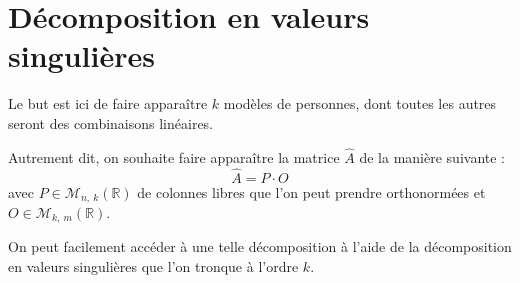 \documentclass[12pt, a4paper]{article}
\newcommand{\Ap}{\widehat{A}} %
\newcommand{\pp}[1]{\left(#1\right)} %
\begin{document}
\section{Décomposition en valeurs singulières}

Le but est ici de faire apparaître $k$ modèles de personnes, dont toutes les autres seront des combinaisons linéaires.

Autrement dit, on souhaite faire apparaître la matrice $\Ap$ de la manière suivante : \[
	\Ap = P\cdot O
\]
avec $P \in \mathcal{M}_{n,\:k}\pp{\mathbb{R}}$ de colonnes libres que l'on peut prendre orthonormées et $O \in \mathcal{M}_{k,\:m}\pp{\mathbb{R}}$.

On peut facilement accéder à une telle décomposition à l'aide de la décomposition en valeurs singulières que l'on tronque à l'ordre $k$.


\nocite{*}


\end{document}
